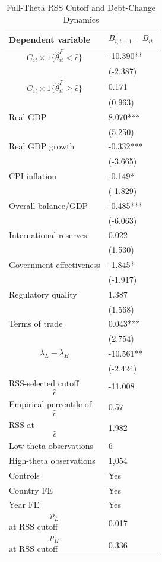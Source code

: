 \begin{table}[H]\centering
\begin{threeparttable}
\caption{Full-Theta RSS Cutoff and Debt-Change Dynamics}
\label{tab:deltaB_rss_cutoff_fulltheta}
\scriptsize
\begin{tabularx}{\textwidth}{lY}
\toprule
Dependent variable & $$B_{i,t+1}-B_{it}$$ \\
\midrule
$$G_{it}\times 1\{\widehat{\theta}^{F}_{it}<\widehat{c}\}$$ & -10.390** \\
 & (-2.387) \\
$$G_{it}\times 1\{\widehat{\theta}^{F}_{it}\geq\widehat{c}\}$$ & 0.171 \\
 & (0.963) \\
Real GDP & 8.070*** \\
 & (5.250) \\
Real GDP growth & -0.332*** \\
 & (-3.665) \\
CPI inflation & -0.149* \\
 & (-1.829) \\
Overall balance/GDP & -0.485*** \\
 & (-6.063) \\
International reserves & 0.022 \\
 & (1.530) \\
Government effectiveness & -1.845* \\
 & (-1.917) \\
Regulatory quality & 1.387 \\
 & (1.568) \\
Terms of trade & 0.043*** \\
 & (2.754) \\
$$\lambda_L-\lambda_H$$ & -10.561** \\
 & (-2.424) \\
\midrule
RSS-selected cutoff $$\widehat{c}$$ & -11.008 \\
Empirical percentile of $$\widehat{c}$$ & 0.57 \\
RSS at $$\widehat{c}$$ & 1.982 \\
Low-theta observations & 6 \\
High-theta observations & 1,054 \\
Controls & Yes \\
Country FE & Yes \\
Year FE & Yes \\
$$p_L$$ at RSS cutoff & 0.017 \\
$$p_H$$ at RSS cutoff & 0.336 \\

\end{tabularx}
\end{threeparttable}
\end{table}
